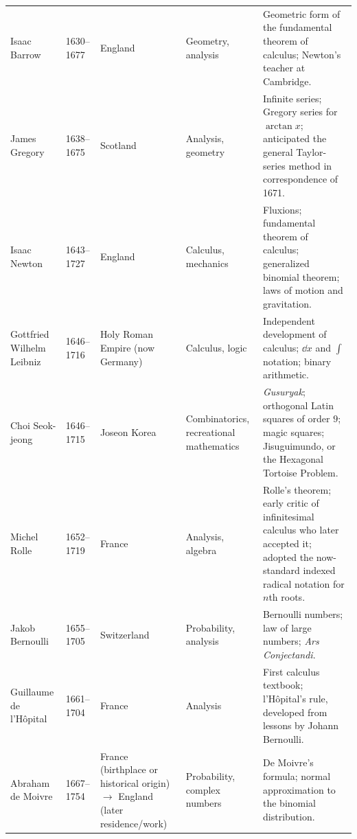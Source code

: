 {\begin{longtable}{@{}L{0.145\textwidth}L{0.09\textwidth}L{0.225\textwidth}L{0.14\textwidth}L{0.30\textwidth}@{}}
        Isaac Barrow
        & 1630--1677
        & England
        & Geometry, analysis
        & Geometric form of the fundamental theorem of calculus; Newton's
          teacher at Cambridge. \\

        James Gregory
        & 1638--1675
        & Scotland
        & Analysis, geometry
        & Infinite series; Gregory series for $\arctan x$; anticipated the
          general Taylor-series method in correspondence of 1671. \\

        Isaac Newton
        & 1643--1727
        & England
        & Calculus, mechanics
        & Fluxions; fundamental theorem of calculus; generalized binomial
          theorem; laws of motion and gravitation. \\

        Gottfried Wilhelm Leibniz
        & 1646--1716
        & Holy Roman Empire (now Germany)
        & Calculus, logic
        & Independent development of calculus; $\dd x$ and $\int$ notation;
          binary arithmetic. \\

        Choi Seok-jeong
        & 1646--1715
        & Joseon Korea
        & Combinatorics, recreational mathematics
        & \textit{Gusuryak}; orthogonal Latin squares of order $9$; magic
          squares; Jisuguimundo, or the Hexagonal Tortoise Problem. \\

        Michel Rolle
        & 1652--1719
        & France
        & Analysis, algebra
        & Rolle's theorem; early critic of infinitesimal calculus who later
          accepted it; adopted the now-standard indexed radical notation for
          $n$th roots. \\

        Jakob Bernoulli
        & 1655--1705
        & Switzerland
        & Probability, analysis
        & Bernoulli numbers; law of large numbers; \textit{Ars Conjectandi}. \\

        Guillaume de l'Hôpital
        & 1661--1704
        & France
        & Analysis
        & First calculus textbook; l'Hôpital's rule, developed from lessons by
          Johann Bernoulli. \\

        Abraham de Moivre
        & 1667--1754
        & France (birthplace or historical origin) \(\to\) England (later residence/work)
        & Probability, complex numbers
        & De Moivre's formula; normal approximation to the binomial
          distribution. \\


\end{longtable}}
